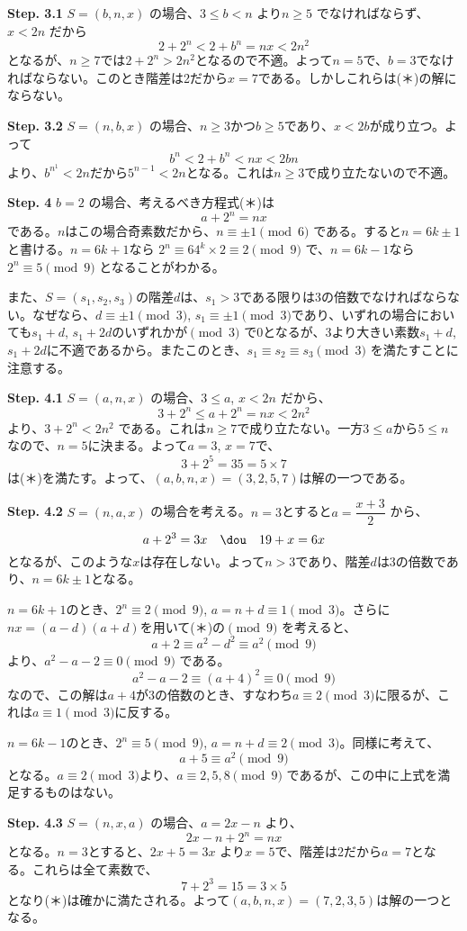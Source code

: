 {\bf \large Step. 3.1} $S=(b,n,x)$ の場合、$3\le b < n$ より$n\ge 5$ でなければならず、$x<2n$ だから
\[ 2+2^n < 2+b^n=nx < 2n^2 \]
となるが、$n\ge 7$では$2+2^n>2n^2$となるので不適。よって$n=5$で、$b=3$でなければならない。このとき階差は2だから$x=7$である。しかしこれらは(＊)の解にならない。

{\bf \large Step. 3.2} $S=(n,b,x)$ の場合、$n\ge 3$かつ$b\ge 5$であり、$x<2b$が成り立つ。よって
\[ b^n<2+b^n<nx<2bn \]
より、$b^{n^1}<2n$だから$5^{n-1}<2n$となる。これは$n\ge 3$で成り立たないので不適。

{\bf \large Step. 4} $b=2$ の場合、考えるべき方程式(＊)は
\[ a+2^n=nx \]
である。$n$はこの場合奇素数だから、$n\equiv \pm 1\pmod{6}$ である。すると$n=6k\pm 1$と書ける。$n=6k+1$なら $2^n\equiv 64^k\times 2\equiv 2 \pmod{9}$ で、$n=6k-1$なら $2^n\equiv 5 \pmod{9}$ となることがわかる。

また、$S=(s_1,s_2,s_3)$の階差$d$は、$s_1>3$である限りは3の倍数でなければならない。なぜなら、$d\equiv\pm 1\pmod{3}$, $s_1\equiv\pm 1\pmod{3}$であり、いずれの場合においても$s_1+d$, $s_1+2d$のいずれかが$\pmod{3}$ で0となるが、3より大きい素数$s_1+d$, $s_1+2d$に不適であるから。またこのとき、$s_1\equiv s_2\equiv s_3 \pmod{3}$ を満たすことに注意する。

{\bf \large Step. 4.1} $S=(a,n,x)$ の場合、$3\le a$, $x<2n$ だから、
\[ 3+2^n\le a+2^n=nx<2n^2 \]
より、$3+2^n<2n^2$ である。これは$n\ge 7$で成り立たない。一方$3\le a$から$5\le n$なので、$n=5$に決まる。よって$a=3$, $x=7$で、
\[ 3+2^5=35=5\times 7 \]
は(＊)を満たす。よって、$(a,b,n,x)=(3,2,5,7)$は解の一つである。

{\bf \large Step. 4.2} $S=(n,a,x)$ の場合を考える。$n=3$とすると$a=\dfrac{x+3}{2}$ から、
\[ a+2^3=3x \quad\dou\quad 19+x=6x \]
となるが、このような$x$は存在しない。よって$n>3$であり、階差$d$は3の倍数であり、$n=6k\pm 1$となる。

$n=6k+1$のとき、$2^n\equiv 2\pmod{9}$, $a=n+d\equiv 1\pmod{3}$。さらに$nx=(a-d)(a+d)$を用いて(＊)の$\pmod{9}$ を考えると、
\[ a+2\equiv a^2-d^2\equiv a^2 \pmod{9} \]
より、$a^2-a-2\equiv 0 \pmod{9}$ である。
\[ a^2-a-2\equiv (a+4)^2 \equiv 0\pmod{9} \]
なので、この解は$a+4$が3の倍数のとき、すなわち$a\equiv 2 \pmod{3}$に限るが、これは$a\equiv 1\pmod{3}$に反する。

$n=6k-1$のとき、$2^n\equiv 5\pmod{9}$, $a=n+d\equiv 2\pmod{3}$。同様に考えて、
\[ a+5\equiv a^2 \pmod{9} \]
となる。$a\equiv 2\pmod{3}$より、$a\equiv 2,5,8 \pmod{9}$ であるが、この中に上式を満足するものはない。

{\bf \large Step. 4.3} $S=(n,x,a)$ の場合、$a=2x-n$ より、
\[ 2x-n+2^n=nx \]
となる。$n=3$とすると、$2x+5=3x$ より$x=5$で、階差は2だから$a=7$となる。これらは全て素数で、
\[ 7+2^3=15=3\times 5 \]
となり(＊)は確かに満たされる。よって$(a,b,n,x)=(7,2,3,5)$は解の一つとなる。

